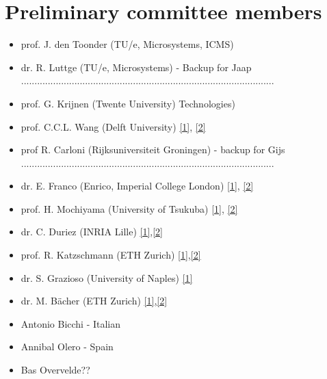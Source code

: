 \section*{Preliminary committee members}
\begin{itemize}[leftmargin=4mm]
\item prof. J. den Toonder (TU/e, Microsystems, ICMS) \vspace{-2mm}
\item dr. R. Luttge (TU/e, Microsystems) - Backup for Jaap \\ ............................................................................................... \vspace{-2mm}
\item prof. G. Krijnen (Twente University) Technologies) \vspace{-2mm}
\item prof. C.C.L. Wang (Delft University) \vspace{-2mm} \href{https://ieeexplore.ieee.org/document/9426391}{[1]}, \href{https://www.researchgate.net/publication/347965436_Jacobian-based_learning_for_inverse_kinematics_of_soft_robots}{[2]}
\item prof R. Carloni (Rijksuniversiteit
Groningen) - backup for Gijs \\ ............................................................................................... \vspace{-2mm}
\item dr. E. Franco (Enrico, Imperial College London) \vspace{-2mm} \href{https://link.springer.com/article/10.1007/s11071-021-06817-1}{[1]}, \href{https://ieeexplore.ieee.org/document/9638969}{[2]}
\item prof. H. Mochiyama (University of Tsukuba) \href{https://www.sciencedirect.com/science/article/pii/S2405896320328226?via%3Dihub}{[1]}, \href{https://ieeexplore.ieee.org/document/1242160}{[2]} \vspace{-2mm}
\item dr. C. Duriez (INRIA Lille) \href{https://hal.inria.fr/hal-01370347/document}{[1]},\href{https://hal.archives-ouvertes.fr/hal-03192168/document}{[2]}\vspace{-2mm}
\item prof. R. Katzschmann (ETH Zurich) \href{https://www.liebertpub.com/doi/pdfplus/10.1089/soro.2014.0022}{[1]},\href{https://arpi.unipi.it/retrieve/handle/11568/996018/683882/Final%20manuscript%20IEEE.pdf}{[2]}\vspace{-2mm}
\item dr. S. Grazioso (University of Naples) \href{https://pubmed.ncbi.nlm.nih.gov/30481112/}{[1]} \vspace{-2mm}
\item dr. M. Bächer (ETH Zurich) \href{https://pubmed.ncbi.nlm.nih.gov/31891526/}{[1]},\href{https://ieeexplore.ieee.org/document/9312179}{[2]}
\item Antonio Bicchi - Italian
\item Annibal Olero - Spain
\item Bas Overvelde??
\end{itemize}
